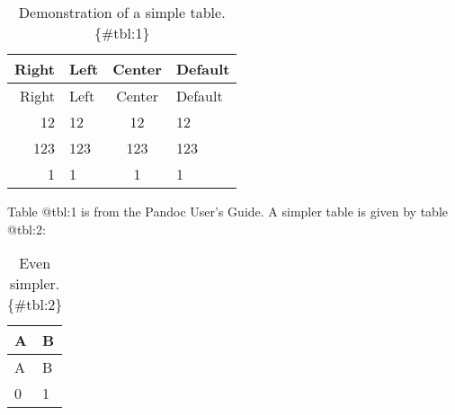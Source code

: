 \begin{longtable}[]{@{}rlcl@{}}
\caption{Demonstration of a simple table. \{\#tbl:1\}}\tabularnewline
\toprule
Right & Left & Center & Default\tabularnewline
\midrule
\endfirsthead
\toprule
Right & Left & Center & Default\tabularnewline
\midrule
\endhead
12 & 12 & 12 & 12\tabularnewline
123 & 123 & 123 & 123\tabularnewline
1 & 1 & 1 & 1\tabularnewline
\bottomrule
\end{longtable}

Table @tbl:1 is from the Pandoc User's Guide. A simpler table is given
by table @tbl:2:

\begin{longtable}[]{@{}ll@{}}
\caption{Even simpler. \{\#tbl:2\}}\tabularnewline
\toprule
A & B\tabularnewline
\midrule
\endfirsthead
\toprule
A & B\tabularnewline
\midrule
\endhead
0 & 1\tabularnewline
\bottomrule
\end{longtable}
